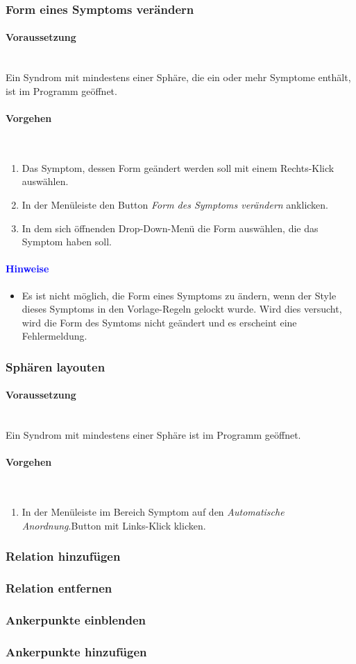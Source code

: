 \documentclass[enabledeprecatedfontcommands,fontsize=11pt,paper=a4,twoside]{scrartcl}
\newcommand*{\hint}{\paragraph{\textcolor{blue}{Hinweise}}}
\newcommand*{\condition}{\paragraph{Voraussetzung}$\;$ \vspace{0.2cm}\\}
\newcommand*{\actions}{\paragraph{Vorgehen} $\;$\vspace{0.2cm}\\}
\begin{document}
			\subsubsection{Form eines Symptoms verändern}
							\condition 	
		Ein Syndrom mit mindestens einer Sphäre, die ein oder mehr Symptome enthält, ist im Programm geöffnet. 
		\actions
		\begin{enumerate}
			\item Das Symptom, dessen Form geändert werden soll mit einem Rechts-Klick auswählen. 
			\item In der Menüleiste den Button \textit{Form des Symptoms verändern} anklicken.
			\item In dem sich öffnenden Drop-Down-Menü die Form auswählen, die das Symptom haben soll.
		\end{enumerate}
		\hint
		\begin{itemize}
			\item Es ist nicht möglich, die Form eines Symptoms zu ändern, wenn der Style dieses Symptoms in den Vorlage-Regeln gelockt wurde. Wird dies versucht, wird die Form des Symtoms nicht geändert und es erscheint eine Fehlermeldung.
		\end{itemize}
		\subsubsection{Sphären layouten}
				\condition 	
		Ein Syndrom mit mindestens einer Sphäre ist im Programm geöffnet. 
		\actions  
		\begin{enumerate}
			\item In der Menüleiste im Bereich Symptom auf den \textit{Automatische Anordnung}.Button mit Links-Klick klicken.
		\end{enumerate}
		\newpage
			
		\subsubsection{Relation hinzufügen}
		\subsubsection{Relation entfernen}
		\subsubsection{Ankerpunkte einblenden}
		\subsubsection{Ankerpunkte hinzufügen}
\end{document}
